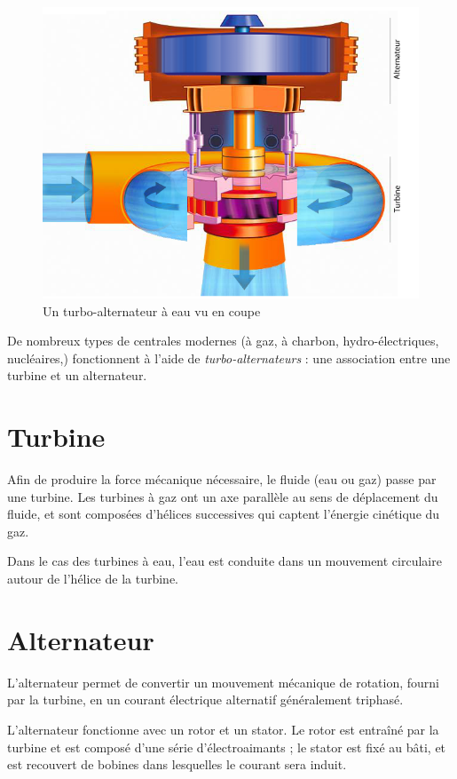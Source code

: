 \documentclass[12pt,a4paper,oneside,openany]{memoir}
\begin{document}
\begin{figure}
	\centering
	\includegraphics[width=0.9\linewidth]{img/coupe_turbo_alternateur}
	\caption{Un turbo-alternateur à eau vu en coupe}
	\label{fig:coupe_turbo_alternateur}
\end{figure}

De nombreux types de centrales modernes (à gaz, à charbon, hydro-électriques, nucléaires,\textellipsis) fonctionnent à l'aide de \emph{turbo-alternateurs} : une association entre une turbine et un alternateur.

\section{Turbine}
Afin de produire la force mécanique nécessaire, le fluide (eau ou gaz) passe par une turbine. Les turbines à gaz ont un axe parallèle au sens de déplacement du fluide, et sont composées d'hélices successives qui captent l'énergie cinétique du gaz.

Dans le cas des turbines à eau, l'eau est conduite dans un mouvement circulaire autour de l'hélice de la turbine.

\section{Alternateur}
L'alternateur permet de convertir un mouvement mécanique de rotation, fourni par la turbine, en un courant électrique alternatif généralement triphasé.

L'alternateur fonctionne avec un rotor et un stator. Le rotor est entraîné par la turbine et est composé d'une série d'électroaimants ; le stator est fixé au bâti, et est recouvert de bobines dans lesquelles le courant sera induit.
\end{document}
